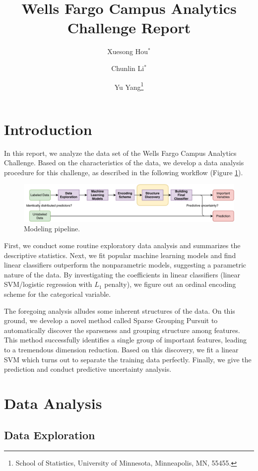 \documentclass[11pt]{article}
\title{Wells Fargo Campus Analytics Challenge Report}
\author{
    Xuesong Hou$^*$ \and 
    Chunlin Li$^*$ \and 
    Yu Yang\footnote{
        School of Statistics, University of Minnesota, 
        Minneapolis, MN, 55455.}
    }
\begin{document}
\maketitle

\section{Introduction}

In this report, we analyze the data set of the Wells Fargo Campus Analytics Challenge. Based on the characteristics of the data, we develop a data analysis procedure for this challenge, as described in the following workflow (Figure \ref{fig:pipeline}). 

\begin{figure}[H]
    \centering
    \includegraphics[width=\textwidth]{pipelinenew.pdf}
    \caption{Modeling pipeline.}
    \label{fig:pipeline}
\end{figure}

First, we conduct some routine exploratory data analysis and summarizes the descriptive statistics. Next, we fit popular machine learning models and find linear classifiers outperform the nonparametric models, suggesting a parametric nature of the data. By investigating the coefficients in linear classifiers (linear SVM/logistic regression with $L_1$ penalty), we figure out an ordinal encoding scheme for the categorical variable.

The foregoing analysis alludes some inherent structures of the data. 
On this ground, we develop a novel method called Sparse Grouping Pursuit to automatically discover the sparseness and grouping structure among features. 
This method successfully identifies a single group of important features,
leading to a tremendous dimension reduction. Based on this discovery, we fit a linear SVM which turns out to separate the training data perfectly. Finally, we give the prediction and conduct predictive uncertainty analysis.


\section{Data Analysis}

\subsection{Data Exploration}
\end{document}
